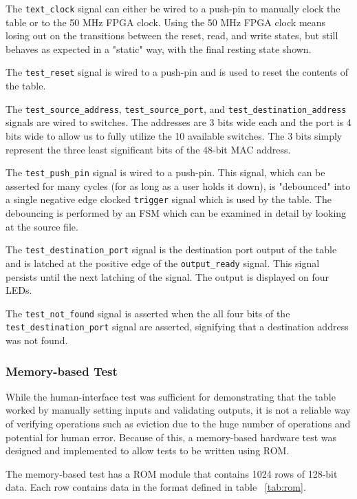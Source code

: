 \documentclass{article}
\begin{document}
The \texttt{text\_clock} signal can either be wired to a push-pin to manually clock the table or to the 50 MHz FPGA clock. Using the 50 MHz FPGA clock means losing out on the transitions between the reset, read, and write states, but still behaves as expected in a "static" way, with the final resting state shown. 

The \texttt{test\_reset} signal is wired to a push-pin and is used to reset the contents of the table.

The \texttt{test\_source\_address}, \texttt{test\_source\_port}, and \texttt{test\_destination\_address} signals are wired to switches. The addresses are 3 bits wide each and the port is 4 bits wide to allow us to fully utilize the 10 available switches. The 3 bits simply represent the three least significant bits of the 48-bit MAC address.

The \texttt{test\_push\_pin} signal is wired to a push-pin. This signal, which can be asserted for many cycles (for as long as a user holds it down), is "debounced" into a single negative edge clocked \texttt{trigger} signal which is used by the table. The debouncing is performed by an FSM which can be examined in detail by looking at the source file.

The \texttt{test\_destination\_port} signal is the destination port output of the table and is latched at the positive edge of the \texttt{output\_ready} signal. This signal persists until the next latching of the signal. The output is displayed on four LEDs.

The \texttt{test\_not\_found} signal is asserted when the all four bits of the \texttt{test\_destination\_port} signal are asserted, signifying that a destination address was not found.

\subsubsection{Memory-based Test}

While the human-interface test was sufficient for demonstrating that the table worked by manually setting inputs and validating outputs, it is not a reliable way of verifying operations such as eviction due to the huge number of operations and potential for human error. Because of this, a memory-based hardware test was designed and implemented to allow tests to be written using ROM.

The memory-based test has a ROM module that contains 1024 rows of 128-bit data. Each row contains data in the format defined in table ~\ref{tab:rom}. 
\end{document}

